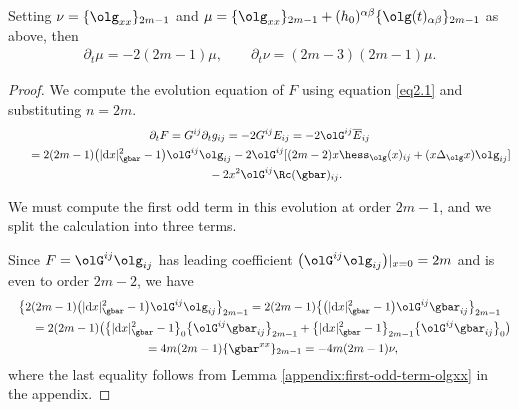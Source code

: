 \begin{Proposition} \label{prop:linear-system} Setting $\nu = \{\olg_{xx}\}_{2m-1}$ and $\mu = \{\olg_{xx}\}_{2m-1} + (h_0)^{\alpha \beta} \{\olg(t)_{\alpha \beta}\}_{2m-1}$
as above, then
\begin{gather*}%
 \partial_t \mu = -2(2m-1) \mu, \qquad
 \partial_t \nu = (2m-3)(2m-1) \mu.
\end{gather*}
\end{Proposition}
\begin{proof}We compute the evolution equation of $F$ using equation \eqref{eq2.1} and substituting $n = 2m$.
\begin{gather*}%
\partial_t F = G^{ij} \partial_t g_{ij} = - 2 G^{ij} E_{ij} = -2 \olG^{ij} \overline{E}_{ij} \\
\hphantom{\partial_t F}{} = 2 (2m-1) \big(|{\rm d}x|^2_{\gbar}-1\big) \olG^{ij} \olg_{ij} -2 \olG^{ij} [ (2m-2) x\hess_{\olg} (x)_{ij} +(x\Delta_{\olg} x) \olg_{ij} ]\\
\hphantom{\partial_t F=}{} -2 x^2\olG^{ij}\Rc(\gbar)_{ij} .
\end{gather*}

We must compute the first odd term in this evolution at order $2m-1$, and we split the calculation into three terms.

Since
$F = \olG^{ij} \olg_{ij}$ has leading coefficient $\big(\olG^{ij} \olg_{ij} \big)\vert_{x=0} = 2m$ and is even to order $2m-2$, we have
\begin{gather*}%
\big\{ 2 (2m-1) \big(|{\rm d}x|^2_{\gbar}-1\big) \olG^{ij} \olg_{ij}\big\}_{2m-1}
= 2 (2m-1) \big\{\big(|{\rm d}x|^2_{\gbar}-1\big) \olG^{ij} \gbar_{ij} \big\}_{2m-1} \\
\qquad{}= 2 (2m-1) \big( \big\{|{\rm d}x|^2_{\gbar}-1\big\}_0 \big\{ \olG^{ij} \gbar_{ij}\big\}_{2m-1} + \big\{|{\rm d}x|^2_{\gbar}-1\big\}_{2m-1}
\big\{ \olG^{ij} \gbar_{ij}\big\}_{0}\big) \\
\qquad{} = 4m (2m-1) \{\gbar^{xx} \}_{2m-1} = -4m(2m-1) \nu ,
\end{gather*}
where the last equality follows from Lemma \ref{appendix:first-odd-term-olgxx} in the appendix.


\end{proof}
